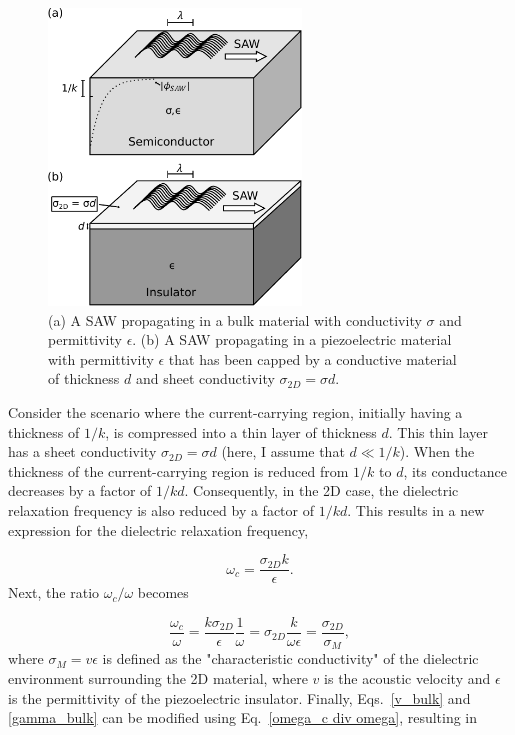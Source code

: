 \documentclass[double,12pt,1in,seploa]{beavtex}
\begin{document}
\begin{figure}
    \includegraphics[width = 0.6\textwidth]{SAW in thin film.pdf}
    \caption{(a) A SAW propagating in a bulk material with conductivity $\sigma$ and permittivity $\epsilon$. (b) A SAW propagating in a piezoelectric material with permittivity $\epsilon$ that has been capped by a conductive material of thickness $d$ and sheet conductivity $\sigma_{2D} = \sigma d$.}
    \label{SAW in thin film}
\end{figure}

Consider the scenario where the current-carrying region, initially having a thickness of $1/k$, is compressed into a thin layer of thickness $d$. This thin layer has a sheet conductivity $\sigma_{2D} = \sigma d$ (here, I assume that $d \ll 1/k$). When the thickness of the current-carrying region is reduced from $1/k$ to $d$, its conductance decreases by a factor of $1/kd$. Consequently, in the 2D case, the dielectric relaxation frequency is also reduced by a factor of $1/kd$. This results in a new expression for the dielectric relaxation frequency, 

\begin{equation}
    \omega_c = \frac{\sigma_{2D}k}{\epsilon}.
\end{equation}
Next, the ratio $\omega_c/\omega$ becomes

\begin{equation}
    \frac{\omega_c}{\omega} = \frac{k\sigma_{2D}}{\epsilon}\frac{1}{\omega} = \sigma_{2D}\frac{k}{\omega \epsilon} = \frac{\sigma_{2D}}{\sigma_M}, \label{omega_c div omega}
\end{equation}
where $\sigma_M = v \epsilon$ is defined as the "characteristic conductivity" of the dielectric environment surrounding the 2D material, where $v$ is the acoustic velocity and $\epsilon$ is the permittivity of the piezoelectric insulator. Finally, Eqs.\ \ref{v_bulk} and \ref{gamma_bulk} can be modified using Eq.\ \ref{omega_c div omega}, resulting in 
\end{document}
